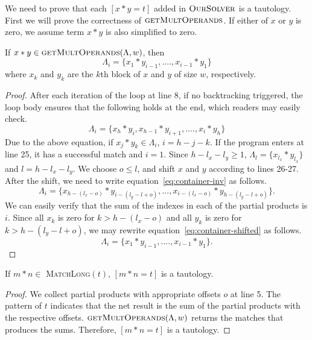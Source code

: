 We need to prove that each $[x*y = t]$ added in $\textsc{OurSolver}$
is a tautology.
%
First we will prove the correctness of $\textsc{getMultOperands}$.
%
If either of $x$ or $y$ is zero, we assume term $x*y$ is also simplified to zero.
\begin{thm}
 If $ x*y \in \textsc{getMultOperands}(\Lambda,w)$, then
 $$
 \Lambda_i = \{ x_1*y_{i-1},....,x_{i-1}*y_1 \}
 $$
  where $x_k$ and $y_k$ are the $k$th block of $x$ and $y$ of size
$w$, respectively.
\end{thm}
\begin{proof}
  After each iteration of the loop at line 8,
  if no backtracking triggered, the loop body ensures
  that the following holds at the end, which readers may easily check.
  \begin{equation}
    \label{eq:container-inv}
  \Lambda_i = \{ x_h*y_{i}, x_{h-1}*y_{i+1},....,x_{i}*y_h \}    
  \end{equation}
  Due to the above equation,
  if $x_j*y_k \in \Lambda_i$, $ i = h-j-k$.
  If the program enters at line 25, it has a successful match and $i=1$.
  Since $h-l_x -l_y \geq 1$, $\Lambda_l = \{x_{l_x}*y_{l_x}\}$
  and $l = h - l_x - l_y$.
  We choose $o \leq l$, and shift $x$ and $y$ according to lines 26-27.
  After the shift, we need to write equation~\eqref{eq:container-inv}
  as follows.
  \begin{equation}
    \label{eq:container-shifted}
    \Lambda_i = \{ x_{h-(l_x-o)}*y_{i-(l_y-l+o)},...,x_{i-(l_x-o)}*y_{h-(l_y-l+o)} \}.
  \end{equation}
  We can easily verify that the sum of the indexes in each of
  the partial products is $i$.
  Since all $x_k$ is zero for $k > h-(l_x-o)$ and all $y_k$ is zero
  for $k > h-(l_y-l+o)$,
  we may rewrite equation~\eqref{eq:container-shifted}
 as follows.
  $$
  \Lambda_i = \{ x_1*y_{i-1},....,x_{i-1}*y_1 \}.
  $$
\end{proof}

\begin{thm}
  If $m*n\in$ \textsc{MatchLong}$(t)$, $[m*n = t]$ is a tautology.
\end{thm}
\begin{proof}
  We collect partial products with appropriate offsets $o$ at line 5.
  The pattern of $t$ indicates that the net result is the sum of the 
  partial products with the respective offsets. 
  $\textsc{getMultOperands}(\Lambda,w)$ returns the
  matches that produces the sums.
  Therefore, $[m*n = t]$ is a tautology.
\end{proof}

